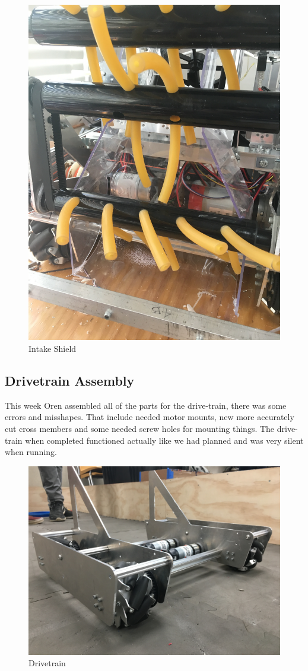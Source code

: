 \documentclass{article}
\begin{document}
\begin{figure}
    \centering
    \includegraphics[width=.6\textwidth, angle=270]{10_11-05/images/intake_shield.JPG}
    \caption{Intake Shield}
    \label{fig:Intake Shield}
\end{figure}

\subsection{Drivetrain Assembly}
This week Oren assembled all of the parts for the drive-train, there was some errors and misshapes. That include needed motor mounts, new more accurately cut cross members and some needed   screw holes for mounting things. The drive-train when completed functioned actually like we had planned and was very silent when running.    

\begin{figure}
    \centering
    \includegraphics[width=.6 \textwidth]{10_11-05/images/drivetrain.JPG}
    \caption{Drivetrain}
    \label{fig:drivetrain}
\end{figure}
\end{document}
